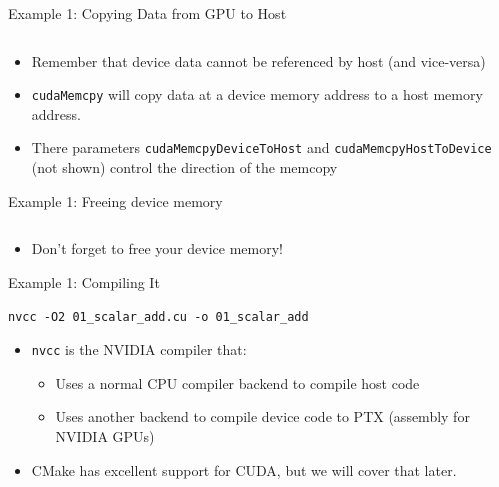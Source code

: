 \documentclass{beamer}
\begin{document}
    \begin{frame}{Example 1: Copying Data from GPU to Host}
        \begin{block}{}
            \inputminted[firstline=13,lastline=13]{cuda}{src/01_scalar_add.cu}
        \end{block}
        \begin{itemize}
            \item Remember that device data cannot be referenced by host (and vice-versa)
            \item \texttt{cudaMemcpy} will copy data at a device memory address to a host memory address.
            \item There parameters \texttt{cudaMemcpyDeviceToHost} and \texttt{cudaMemcpyHostToDevice} (not shown) control the direction of the memcopy
        \end{itemize}
    \end{frame}

    \begin{frame}{Example 1:  Freeing device memory}
        \begin{block}{}
            \inputminted[firstline=17,lastline=17]{cuda}{src/01_scalar_add.cu}
        \end{block}
        \begin{itemize}
            \item Don't forget to free your device memory!
        \end{itemize}
    \end{frame}

    \begin{frame}{Example 1: Compiling It}
        \begin{block}{}
\texttt{nvcc -O2 01\_scalar\_add.cu -o 01\_scalar\_add}
        \end{block}
        \begin{itemize}
            \item \texttt{nvcc} is the NVIDIA compiler that:
            \begin{itemize}
                \item Uses a normal CPU compiler backend to compile host code
                \item Uses another backend to compile device code to PTX (assembly for NVIDIA GPUs)
            \end{itemize}
            \item CMake has excellent support for CUDA, but we will cover that later.
        \end{itemize}
    \end{frame}
\end{document}
